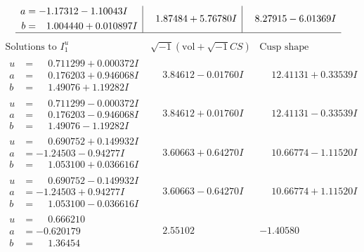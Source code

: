 \documentclass[1p]{elsarticle_modified}
\theoremstyle{definition}
\newcommand{\I}{\sqrt{-1}}
\begin{document}
$$\begin{array}{c|c|c}
\begin{aligned}
a &= -1.17312 - 1.10043 I \\
b &= \phantom{-}1.004440 + 0.010897 I\end{aligned}
 & \phantom{-}1.87484 + 5.76780 I & \phantom{-}8.27915 - 6.01369 I\\
 \hline 
 \end{array}$$\newpage$$\begin{array}{c|c|c}  
\text{Solutions to }I^u_{1}& \I (\text{vol} + \sqrt{-1}CS) & \text{Cusp shape}\\
 \hline 
\begin{aligned}
u &= \phantom{-}0.711299 + 0.000372 I \\
a &= \phantom{-}0.176203 + 0.946068 I \\
b &= \phantom{-}1.49076 + 1.19282 I\end{aligned}
 & \phantom{-}3.84612 - 0.01760 I & \phantom{-}12.41131 + 0.33539 I \\ \hline\begin{aligned}
u &= \phantom{-}0.711299 - 0.000372 I \\
a &= \phantom{-}0.176203 - 0.946068 I \\
b &= \phantom{-}1.49076 - 1.19282 I\end{aligned}
 & \phantom{-}3.84612 + 0.01760 I & \phantom{-}12.41131 - 0.33539 I \\ \hline\begin{aligned}
u &= \phantom{-}0.690752 + 0.149932 I \\
a &= -1.24503 - 0.94277 I \\
b &= \phantom{-}1.053100 + 0.036616 I\end{aligned}
 & \phantom{-}3.60663 + 0.64270 I & \phantom{-}10.66774 - 1.11520 I \\ \hline\begin{aligned}
u &= \phantom{-}0.690752 - 0.149932 I \\
a &= -1.24503 + 0.94277 I \\
b &= \phantom{-}1.053100 - 0.036616 I\end{aligned}
 & \phantom{-}3.60663 - 0.64270 I & \phantom{-}10.66774 + 1.11520 I \\ \hline\begin{aligned}
u &= \phantom{-}0.666210\phantom{ +0.000000I} \\
a &= -0.620179\phantom{ +0.000000I} \\
b &= \phantom{-}1.36454\phantom{ +0.000000I}\end{aligned}
 & \phantom{-}2.55102\phantom{ +0.000000I} & -1.40580\phantom{ +0.000000I} \\ \hline\begin{aligned}

\end{aligned}
\end{array}$$
\end{document}
